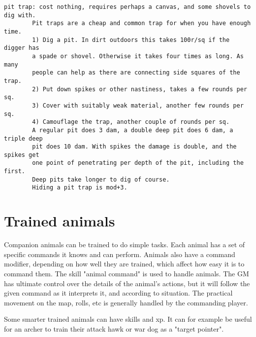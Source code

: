 \begin{verbatim}
pit trap: cost nothing, requires perhaps a canvas, and some shovels to dig with.
        Pit traps are a cheap and common trap for when you have enough time.
        1) Dig a pit. In dirt outdoors this takes 100r/sq if the digger has
        a spade or shovel. Otherwise it takes four times as long. As many
        people can help as there are connecting side squares of the trap.
        2) Put down spikes or other nastiness, takes a few rounds per sq.
        3) Cover with suitably weak material, another few rounds per sq.
        4) Camouflage the trap, another couple of rounds per sq.
        A regular pit does 3 dam, a double deep pit does 6 dam, a triple deep
        pit does 10 dam. With spikes the damage is double, and the spikes get
        one point of penetrating per depth of the pit, including the first.
        Deep pits take longer to dig of course.
        Hiding a pit trap is mod+3.
\end{verbatim} \normalsize











\section*{Trained animals}

Companion animals can be trained to do simple tasks. Each animal has a set of specific commands it knows and can perform. Animals also have a command modifier, depending on how well they are trained, which affect how easy it is to command them. The skill "animal command" is used to handle animals.
The GM has ultimate control over the details of the animal's actions, but it will follow the given command as it interprets it, and according to situation. The practical movement on the map, rolls, etc is generally handled by the commanding player.

Some smarter trained animals can have skills and xp.
It can for example be useful for an archer to train their attack hawk or war dog as a "target pointer".



\openitemslist

